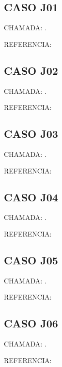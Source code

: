 \documentclass{undftex}
\begin{document}
\begin{refsection}\section*{CASO J01} CHAMADA: . \textcite{v15}\par REFERENCIA:\par\printbibliography[heading=none,check=undfconsultadas]\end{refsection}\clearpage
\begin{refsection}\section*{CASO J02} CHAMADA: . \textcite{v16m}\par REFERENCIA:\par\printbibliography[heading=none,check=undfconsultadas]\end{refsection}\clearpage
\begin{refsection}\section*{CASO J03} CHAMADA: . \textcite{j03}\par REFERENCIA:\par\printbibliography[heading=none,check=undfconsultadas]\end{refsection}\clearpage
\begin{refsection}\section*{CASO J04} CHAMADA: . \textcite{j04}\par REFERENCIA:\par\printbibliography[heading=none,check=undfconsultadas]\end{refsection}\clearpage
\begin{refsection}\section*{CASO J05} CHAMADA: . \textcite{j05}\par REFERENCIA:\par\printbibliography[heading=none,check=undfconsultadas]\end{refsection}\clearpage
\begin{refsection}\section*{CASO J06} CHAMADA: . \textcite{j06}\par REFERENCIA:\par\printbibliography[heading=none,check=undfconsultadas]\end{refsection}\clearpage
\end{document}
